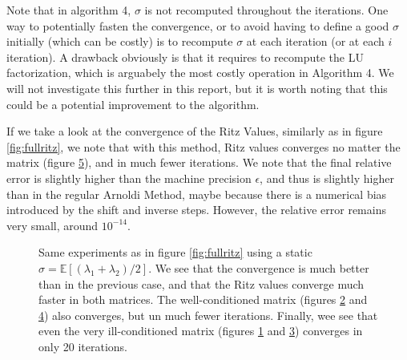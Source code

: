 \documentclass[11pt]{article}
\numberwithin{equation}{section}
\begin{document}
Note that in algorithm 4, $\sigma$ is not recomputed throughout the iterations. One way to potentially fasten the convergence, or to avoid having to define a good $\sigma$ initially (which can be costly) is to recompute $\sigma$ at each iteration (or at each $i$ iteration). A drawback obviously is that it requires to recompute the LU factorization, which is arguabely the most costly operation in Algorithm 4. We will not investigate this further in this report, but it is worth noting that this could be a potential improvement to the algorithm.

If we take a look at the convergence of the Ritz Values, similarly as in figure \ref{fig:fullritz}, we note that with this method, Ritz values converges no matter the matrix (figure \ref{fig:shiftritz_full}), and in much fewer iterations. We note that the final relative error is slightly higher than the machine precision $\epsilon$, and thus is slightly higher than in the regular Arnoldi Method, maybe because there is a numerical bias introduced by the shift and inverse steps. However, the relative error remains very small, around $10^{-14}$.

\begin{figure}
    \centering
    \begin{subfigure}[b]{.45\linewidth}
        
        \caption{}
        \label{fig:ritz_shift_bad}
    \end{subfigure}\hspace{0.05\linewidth}
    \begin{subfigure}[b]{.45\linewidth}
        
        \caption{}
        \label{fig:ritz_shift_good}
    \end{subfigure}
    \begin{subfigure}[b]{.45\linewidth}
        
        \caption{}
        \label{fig:sign_shift_bad}
    \end{subfigure}\hspace{0.05\linewidth}
    \begin{subfigure}[b]{.45\linewidth}
        
        \caption{}
        \label{fig:sign_shift_good}
    \end{subfigure}
    \caption{Same experiments as in figure \ref{fig:fullritz} using a static $\sigma=\mathbb{E}[(\lambda_1+\lambda_2)/2]$. We see that the convergence is much better than in the previous case, and that the Ritz values converge much faster in both matrices. The well-conditioned matrix (figures \ref{fig:ritz_shift_good} and \ref{fig:sign_shift_good}) also converges, but un much fewer iterations. Finally, wee see that even the very ill-conditioned matrix (figures \ref{fig:ritz_shift_bad} and \ref{fig:sign_shift_bad}) converges in only 20 iterations.}
    \label{fig:shiftritz_full}
\end{figure}
\end{document}
